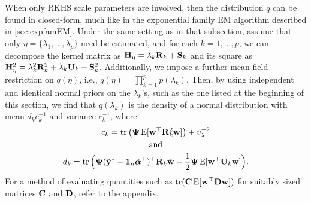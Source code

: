 When only RKHS scale parameters are involved, then the distribution $q$ can be found in closed-form, much like in the exponential family EM algorithm described in \cref{sec:expfamEM}.
Under the same setting as in that subsection, assume that only $\eta = \{\lambda_1,\dots,\lambda_p\}$ need be estimated, and for each $k=1,\dots,p$, we can decompose the kernel matrix as ${\mathbf H}_\eta = \lambda_k {\mathbf R}_k + {\mathbf S}_k$ and its square as ${\mathbf H}_\eta^2 = \lambda_k^2 {\mathbf R}_k^2 + \lambda_k {\mathbf U}_k + {\mathbf S}_k^2$.
Additionally, we impose a further mean-field restriction on $q(\eta)$, i.e., $q(\eta) = \prod_{k=1}^p p(\lambda_k)$.
Then, by using independent and identical normal priors on the $\lambda_k$'s, such as the one listed at the beginning of this section, we find that $q(\lambda_k)$ is the density of a normal distribution with mean $d_kc_k^{-1}$ and variance $c_k^{-1}$, where
\begin{gather*}
  c_k = \operatorname{tr}\big({\bm\Psi}\operatorname{E}[{\mathbf w}^\top{\mathbf R}_k^2{\mathbf w}]\big) + v_\lambda^{-2} \\
  \hspace{0.5cm}\text{and}\hspace{0.5cm} \\
  d_k = \operatorname{tr}\Big({\bm\Psi}(\tilde{{\mathbf y}}^* - {\mathbf 1}_n\tilde{{\bm\alpha}}^\top)^\top{\mathbf R}_k \tilde{{\mathbf w}} 
  - \frac{1}{2}{\bm\Psi}\operatorname{E}[{\mathbf w}^\top {\mathbf U}_k {\mathbf w}] \Big). 
\end{gather*}
For a method of evaluating quantities such as $\operatorname{tr}({\mathbf C}\operatorname{E}[{\mathbf w}^\top{\mathbf D}{\mathbf w} ])$ for suitably sized matrices ${\mathbf C}$ and ${\mathbf D}$, refer to the appendix.

%

